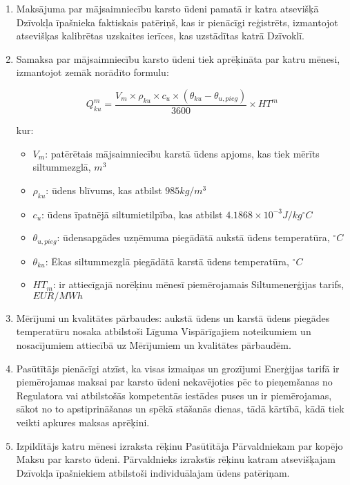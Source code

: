 \begin{enumerate}
	\item Maksājuma par mājsaimniecību karsto ūdeni pamatā ir katra atsevišķā Dzīvokļa īpašnieka faktiskais patēriņš, kas ir pienācīgi reģistrēts, izmantojot atsevišķas kalibrētas uzskaites ierīces, kas uzstādītas katrā Dzīvoklī.
	\item Samaksa par mājsaimniecību karsto ūdeni tiek aprēķināta par katru mēnesi, izmantojot zemāk norādīto formulu:

\[ Q^{m}_{ku} = \frac{V_m \times \rho_{ku} \times c_u \times \left(\theta_{ku} - \theta_{u,pieg}\right)}{3600} \times HT^m \]

kur:

\begin{itemize}
	\item $V_m$: patērētais mājsaimniecību karstā ūdens apjoms, kas tiek mērīts siltummezglā, $m^3$
	\item $\rho_{ku}$: ūdens blīvums, kas atbilst $985 kg/m^3$
	\item $c_u$: ūdens īpatnējā siltumietilpība, kas atbilst $4.1868 \times 10^{-3} J/kg^\circ C$
	\item $\theta_{u,pieg}$: ūdensapgādes uzņēmuma piegādātā aukstā ūdens temperatūra, $^\circ C$
	\item $\theta_{ku}$: Ēkas siltummezglā piegādātā karstā ūdens temperatūra, $^\circ C$
	\item $HT_m$: ir attiecīgajā norēķinu mēnesī piemērojamais Siltumenerģijas tarifs, $EUR/MWh$
\end{itemize}

	\item Mērījumi un kvalitātes pārbaudes: aukstā ūdens un karstā ūdens piegādes temperatūru nosaka atbilstoši Līguma Vispārīgajiem noteikumiem un nosacījumiem attiecībā uz Mērījumiem un kvalitātes pārbaudēm.
	\item Pasūtītājs pienācīgi atzīst, ka visas izmaiņas un grozījumi Enerģijas tarifā ir piemērojamas maksai par karsto ūdeni nekavējoties pēc to pieņemšanas no Regulatora vai atbilstošās kompetentās iestādes puses un ir piemērojamas, sākot no to apstiprināšanas un spēkā stāšanās dienas, tādā kārtībā, kādā tiek veikti apkures maksas aprēķini.
	\item Izpildītājs katru mēnesi izraksta rēķinu Pasūtītāja Pārvaldniekam par kopējo Maksu par karsto ūdeni. Pārvaldnieks izrakstīs rēķinu katram atsevišķajam Dzīvokļa īpašniekiem atbilstoši individuālajam ūdens patēriņam.
\end{enumerate}
